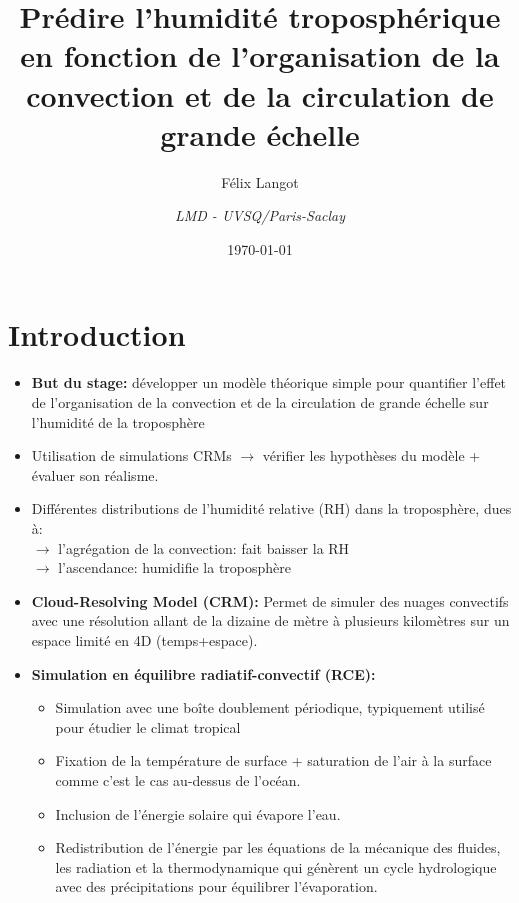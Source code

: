 \documentclass[10pt]{beamer}
\title{Prédire l'humidité troposphérique en fonction de l'organisation de la convection et de la circulation de grande échelle}
\subtitle{Félix Langot}
\date{\today}
\author{\textit{LMD - UVSQ/Paris-Saclay}}
\institute{}
\begin{document}
\maketitle

\section*{Introduction}
\begin{frame}{\secname}

    \begin{itemize}
        \item \textbf{But du stage:} développer un modèle théorique simple pour quantifier l'effet de l'organisation de la convection et de la circulation de grande échelle sur l'humidité de la troposphère 
        \item Utilisation de simulations CRMs $\rightarrow$ vérifier les hypothèses du modèle + évaluer son réalisme. 
        \item Différentes distributions de l'humidité relative (RH) dans la troposphère, dues à: \\
        $\rightarrow$ l'agrégation de la convection: fait baisser la RH  \\
        $\rightarrow$ l'ascendance: humidifie la troposphère \\
        \autocite{Tobin2012}
    \end{itemize}

\end{frame}

\begin{frame}{\secname}
    \begin{itemize}
        \item \textbf{Cloud-Resolving  Model  (CRM):} Permet de simuler des nuages convectifs avec une résolution allant de la dizaine de mètre à plusieurs kilomètres sur un espace limité en 4D (temps+espace).
        \item \textbf{Simulation en équilibre radiatif-convectif (RCE):} 
        \begin{itemize}
            \item Simulation avec une boîte doublement périodique, typiquement utilisé pour étudier le climat tropical
            \item Fixation de la température de surface + saturation de l'air à la surface comme c'est le cas au-dessus de l'océan. 
            \item Inclusion de l'énergie solaire qui évapore l'eau. 
            \item Redistribution de l'énergie par les équations de la mécanique des fluides, les radiation et la thermodynamique qui génèrent un cycle hydrologique avec des précipitations pour équilibrer l'évaporation.
        \end{itemize}
    \end{itemize}
\end{frame}
\end{document}

